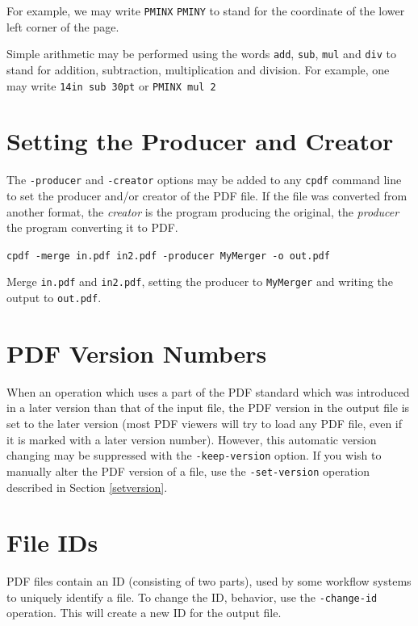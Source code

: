 \documentclass{book}
\begin{document}
\noindent For example, we may write \texttt{PMINX} \texttt{PMINY} to stand for the coordinate of the lower left corner of the page.

Simple arithmetic may be performed using the words \texttt{add}, \texttt{sub}, \texttt{mul} and \texttt{div} to stand for addition, subtraction, multiplication and division. For example, one may write \texttt{14in\hspace{-1mm} sub\hspace{-1mm} 30pt} or \texttt{PMINX\hspace{-1mm} mul\hspace{-1mm} 2}

\section{Setting the Producer and Creator}
The \texttt{-producer} and \texttt{-creator} options may be added to any \texttt{cpdf} command line to set the producer and/or creator of the PDF file. If the file was converted from another format, the \textit{creator} is the program producing the original, the \textit{producer} the program converting it to PDF.

\begin{framed}
  \noindent\small\verb!cpdf -merge in.pdf in2.pdf -producer MyMerger -o out.pdf!

  \vspace{2.5mm}
  \noindent Merge \texttt{in.pdf} and \texttt{in2.pdf}, setting the producer to \texttt{MyMerger} and writing the output to \texttt{out.pdf}.\end{framed}

\section{PDF Version Numbers}
When an operation which uses a part of the PDF standard which was introduced in
a later version than that of the input file, the PDF version in the output file
is set to the later version (most PDF viewers will try to load any PDF file,
even if it is marked with a later version number). However, this automatic
version changing may be suppressed with the \texttt{-keep-version} option. If you wish to manually alter the PDF version of a file, use the
\texttt{-set-version} operation described in Section \ref{setversion}.

\section{File IDs}
PDF files contain an ID (consisting of two parts), used by some workflow
systems to uniquely identify a file. To change the ID, behavior, use the
\texttt{-change-id} operation. This will create a new ID for the output file. 
\end{document}
